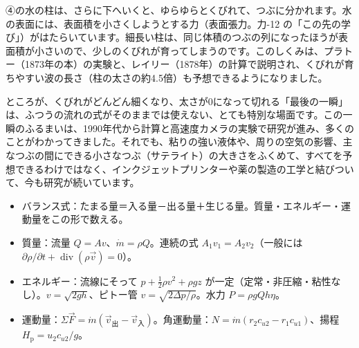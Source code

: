 \begin{phmada}
④の水の柱は、さらに下へいくと、ゆらゆらとくびれて、つぶに分かれます。水の表面には、表面積を小さくしようとする力（表面張力。力-12 の「この先の学び」）がはたらいています。細長い柱は、同じ体積のつぶの列になったほうが表面積が小さいので、少しのくびれが育ってしまうのです。このしくみは、プラトー（1873年の本）の実験と、レイリー（1878年）の計算で説明され、くびれが育ちやすい波の長さ（柱の太さの約4.5倍）も予想できるようになりました。

ところが、くびれがどんどん細くなり、太さが0になって切れる「最後の一瞬」は、ふつうの流れの式がそのままでは使えない、とても特別な場面です。この一瞬のふるまいは、1990年代から計算と高速度カメラの実験で研究が進み、多くのことがわかってきました。それでも、粘りの強い液体や、周りの空気の影響、主なつぶの間にできる小さなつぶ（サテライト）の大きさをふくめて、すべてを予想できるわけではなく、インクジェットプリンターや薬の製造の工学と結びついて、今も研究が続いています。
\end{phmada}

\begin{taisetsu}
\begin{itemize}[leftmargin=1.2\zw, itemsep=2pt, topsep=0pt, label={\color{bkNavy}●}]
\item バランス式：たまる量＝入る量－出る量＋生じる量。質量・エネルギー・運動量をこの形で数える。
\item 質量：流量 $Q=Av$、$\dot m=\rho Q$。連続の式 $A_1v_1=A_2v_2$（一般には $\partial\rho/\partial t+\operatorname{div}(\rho\vec{v})=0$）。
\item エネルギー：流線にそって $p+\tfrac{1}{2}\rho v^2+\rho gz$ が一定（定常・非圧縮・粘性なし）。$v=\sqrt{2gh}$、ピトー管 $v=\sqrt{2\Delta p/\rho}$。水力 $P=\rho gQh\eta$。
\item 運動量：$\Sigma\vec{F}=\dot m(\vec{v}_{\text{出}}-\vec{v}_{\text{入}})$。角運動量：$N=\dot m(r_2c_{u2}-r_1c_{u1})$、揚程 $H_{\mathrm p}=u_2c_{u2}/g$。
\end{itemize}
\end{taisetsu}

\begin{kotoba}\small
{}
\end{kotoba}

